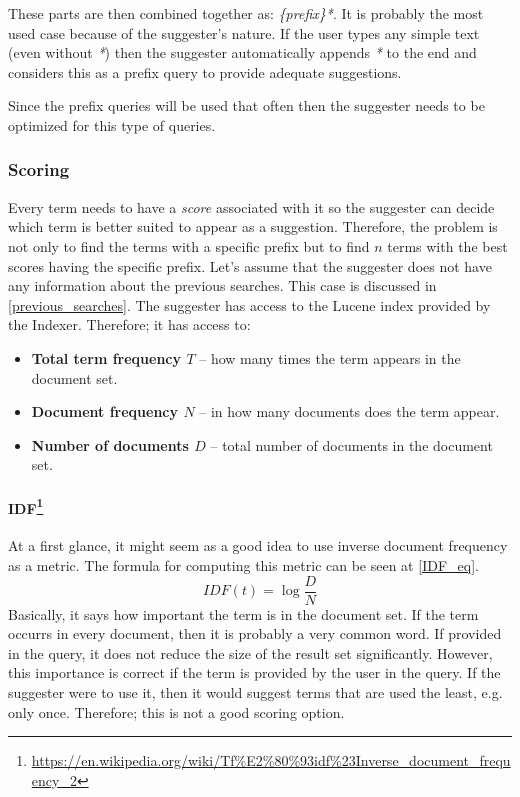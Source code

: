 These parts are then combined together as: \textit{\{prefix\}*}.
It is probably the most used case because of the suggester's nature. If the user types any simple text (even without \textit{*}) then
the suggester automatically appends \textit{*} to the end and considers this as a prefix query to provide adequate suggestions.

Since the prefix queries will be used that often then the suggester needs to be optimized for this type of queries.

\subsubsection{Scoring}
\label{prefix_scoring}
Every term needs to have a \textit{score} associated with it so the suggester can decide which term is better suited
to appear as a suggestion. Therefore, the problem is not only to find the terms with a specific prefix but to find $n$
terms with the best scores having the specific prefix. Let's assume that the suggester does not have any information
about the previous searches. This case is discussed in
\ref{previous_searches}. The suggester has access to the Lucene index provided by the Indexer. %
Therefore; it has access to:
\begin{itemize}
    \item \textbf{Total term frequency $T$} – how many times the term appears in the document set.
    \item \textbf{Document frequency $N$} – in how many documents does the term appear.
    \item \textbf{Number of documents $D$} – total number of documents in the document set.
\end{itemize}

\paragraph{IDF\protect\footnote{\url{https://en.wikipedia.org/wiki/Tf\%E2\%80\%93idf\%23Inverse\_document\_frequency\_2}}}
At a first glance, it might seem as a good idea to use inverse document frequency as a metric. The formula for computing this metric can be seen at \ref{IDF_eq}.
\begin{equation}
\label{IDF_eq}
IDF(t) = \log{\frac{D}{N}}
\end{equation}
Basically, it says how important the term is in the document set. If the term occurrs in every document, then it is probably
a very common word. If provided in the query, it does not reduce the size of the result set significantly.
However, this importance is correct if the term is
provided by the user in the query. If the suggester were to use it, then it would suggest terms that are used the least, e.g. only once.
Therefore; this is not a good scoring option.

